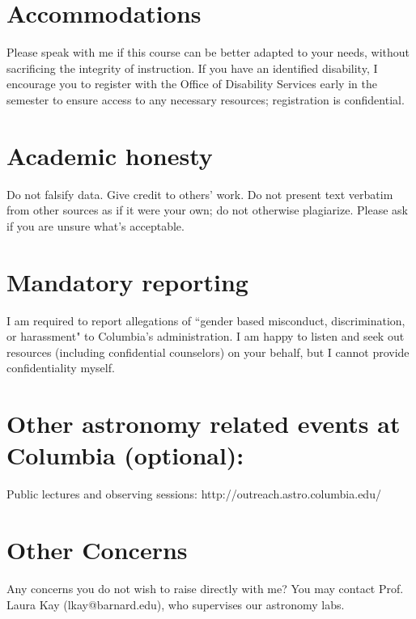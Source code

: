 \documentclass[12pt]{article}
\begin{document}
\section*{Accommodations}
Please speak with me if this course can be better adapted to your needs, without sacrificing the integrity of
instruction. If you have an identified disability, I encourage you to register with the Office of Disability
Services early in the semester to ensure access to any necessary resources; registration is confidential.
 
\section*{Academic honesty}
Do not falsify data. Give credit to others' work. Do not present text verbatim from other sources as if it
were your own; do not otherwise plagiarize. Please ask if you are unsure what's acceptable. 
 
\section*{Mandatory reporting}
I am required to report allegations of ``gender based misconduct, discrimination, or harassment" to
Columbia's administration. I am happy to listen and seek out resources (including confidential
counselors) on your behalf, but I cannot provide confidentiality myself.
 
\section*{Other astronomy related events at Columbia (optional):}
Public lectures and observing sessions: http://outreach.astro.columbia.edu/

\section*{Other Concerns}
Any concerns you do not wish to raise directly with me?
You may contact Prof. Laura Kay (lkay@barnard.edu), who supervises our astronomy labs.
 
\end{document}
